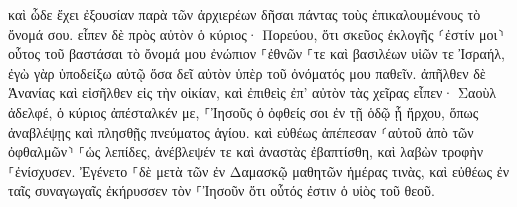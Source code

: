 \documentclass{openreader}
\begin{document}
καὶ ὧδε ἔχει ἐξουσίαν παρὰ τῶν ἀρχιερέων δῆσαι πάντας τοὺς ἐπικαλουμένους τὸ ὄνομά σου. 
εἶπεν δὲ πρὸς αὐτὸν ὁ κύριος· Πορεύου, ὅτι σκεῦος ἐκλογῆς ⸂ἐστίν μοι⸃ οὗτος τοῦ βαστάσαι τὸ ὄνομά μου ἐνώπιον ⸀ἐθνῶν ⸀τε καὶ βασιλέων υἱῶν τε Ἰσραήλ, 
ἐγὼ γὰρ ὑποδείξω αὐτῷ ὅσα δεῖ αὐτὸν ὑπὲρ τοῦ ὀνόματός μου παθεῖν. 
ἀπῆλθεν δὲ Ἁνανίας καὶ εἰσῆλθεν εἰς τὴν οἰκίαν, καὶ ἐπιθεὶς ἐπ’ αὐτὸν τὰς χεῖρας εἶπεν· Σαοὺλ ἀδελφέ, ὁ κύριος ἀπέσταλκέν με, ⸀Ἰησοῦς ὁ ὀφθείς σοι ἐν τῇ ὁδῷ ᾗ ἤρχου, ὅπως ἀναβλέψῃς καὶ πλησθῇς πνεύματος ἁγίου. 
καὶ εὐθέως ἀπέπεσαν ⸂αὐτοῦ ἀπὸ τῶν ὀφθαλμῶν⸃ ⸀ὡς λεπίδες, ἀνέβλεψέν τε καὶ ἀναστὰς ἐβαπτίσθη, 
καὶ λαβὼν τροφὴν ⸀ἐνίσχυσεν. Ἐγένετο ⸀δὲ μετὰ τῶν ἐν Δαμασκῷ μαθητῶν ἡμέρας τινὰς, 
καὶ εὐθέως ἐν ταῖς συναγωγαῖς ἐκήρυσσεν τὸν ⸀Ἰησοῦν ὅτι οὗτός ἐστιν ὁ υἱὸς τοῦ θεοῦ. 
\end{document}
